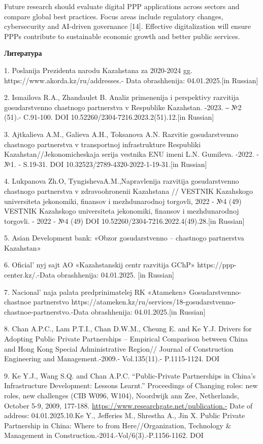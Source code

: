 Future research should evaluate digital PPP applications across sectors
and compare global best practices. Focus areas include regulatory
changes, cybersecurity and AI-driven governance {[}14{]}. Effective
digitalization will ensure PPPs contribute to sustainable economic
growth and better public services.

{\bfseries Литература}

1. Poslanija Prezidenta narodu Kazahstana za 2020-2024 gg.
https://www.akorda.kz/ru/addresses.- Data obrashhenija: 04.01.2025.{[}in
Russian{]}

2. Ismailova R.A., Zhandaulet B. Analiz primenenija i perspektivy
razvitija gosudarstvenno chastnogo partnerstva v Respublike Kazahstan.
-2023. ‒ №2 (51).- C.91-100. DOI 10.52260/2304-7216.2023.2(51).12.{[}in
Russian{]}

3. Ajtkalieva A.M., Galieva A.H., Toksanova A.N. Razvitie gosudarstvenno
chastnogo partnerstva v transportnoj infrastrukture Respubliki
Kazahstan//Jekonomicheskaja serija vestnika ENU imeni L.N. Gumileva.
-2022. -№1. - S.19-31. DOI 10.32523/2789-4320-2022-1-19-31.{[}in
Russian{]}

4. Lukpanova Zh.O, TyngishevaA.M.,Napravlenija razvitija gosudarstvenno
chastnogo partnerstva v zdravoohronenii Kazahstana // VESTNIK Kazahskogo
universiteta jekonomiki, finansov i mezhdunarodnoj torgovli, 2022 - №4
(49) VESTNIK Kazahskogo universiteta jekonomiki, finansov i
mezhdunarodnoj torgovli. - 2022 - №4 (49) DOI
10.52260/2304-7216.2022.4(49).28.{[}in Russian{]}

5. Asian Development bank: «Obzor gosudarstvenno -- chastnogo
partnerstva Kazahstan»

6. Oficial' nyj sajt AO «Kazahstanskij centr razvitija
GChP» https://ppp-center.kz/.-Data obrashhenija: 04.01.2025. {[}in
Russian{]}

7. Nacional' naja palata predprinimatelej RK «Atameken»
Gosudarstvenno-chastnoe partnerstvo
https://atameken.kz/ru/services/18-gosudarstvenno-chastnoe-partnerstvo.-Data
obrashhenija: 04.01.2025.{[}in Russian{]}

8. Chan A.P.C., Lam P.T.I., Chan D.W.M., Cheung E. and Ke Y.J. Drivers
for Adopting Public Private Partnerships -- Empirical Comparison between
China and Hong Kong Special Administrative Region// Journal of
Construction Engineering and Management.-2009.- Vol.135(11).-
P.1115-1124. DOI
\href{http://dx.doi.org/10.1061/(ASCE)CO.1943-7862.0000088}{}

9. Ke Y.J., Wang S.Q. and Chan A.P.C. ``Public-Private Partnerships in
China's Infrastructure Development: Lessons Learnt.'' Proceedings of
Changing roles: new roles, new challenges (CIB W096, W104), Noordwijk
ann Zee, Netherlands, October 5-9, 2009, 177-188.
\url{https://www.researchgate.net/publication.-} Date of address:
04.01.2025.10.Ke Y., Jefferies M., Shrestha A., Jin X. Public Private Partnership
in China: Where to from Here//Organization, Technology \& Management in
Construction.-2014.-Vol/6(3).-P.1156-1162. DOI
\href{http://dx.doi.org/10.5592/otmcj.2014.3.10}{}

